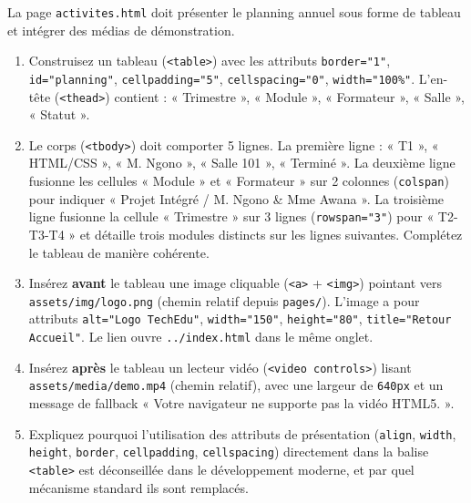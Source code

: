\documentclass[11pt]{article}
\begin{document}
\begin{exercice}
La page \texttt{activites.html} doit présenter le planning annuel sous forme de tableau et intégrer des médias de démonstration.
\begin{enumerate}
    \item Construisez un tableau (\texttt{<table>}) avec les attributs \texttt{border="1"}, \texttt{id="planning"}, \texttt{cellpadding="5"}, \texttt{cellspacing="0"}, \texttt{width="100\%"}. L'en-tête (\texttt{<thead>}) contient : « Trimestre », « Module », « Formateur », « Salle », « Statut ».
    \item Le corps (\texttt{<tbody>}) doit comporter 5 lignes. La première ligne : « T1 », « HTML/CSS », « M. Ngono », « Salle 101 », « Terminé ». La deuxième ligne fusionne les cellules « Module » et « Formateur » sur 2 colonnes (\texttt{colspan}) pour indiquer « Projet Intégré / M. Ngono \& Mme Awana ». La troisième ligne fusionne la cellule « Trimestre » sur 3 lignes (\texttt{rowspan="3"}) pour « T2-T3-T4 » et détaille trois modules distincts sur les lignes suivantes. Complétez le tableau de manière cohérente.
    \item Insérez \textbf{avant} le tableau une image cliquable (\texttt{<a>} + \texttt{<img>}) pointant vers \texttt{assets/img/logo.png} (chemin relatif depuis \texttt{pages/}). L'image a pour attributs \texttt{alt="Logo TechEdu"}, \texttt{width="150"}, \texttt{height="80"}, \texttt{title="Retour Accueil"}. Le lien ouvre \texttt{../index.html} dans le même onglet.
    \item Insérez \textbf{après} le tableau un lecteur vidéo (\texttt{<video controls>}) lisant \texttt{assets/media/demo.mp4} (chemin relatif), avec une largeur de \texttt{640px} et un message de fallback « Votre navigateur ne supporte pas la vidéo HTML5. ».
    \item Expliquez pourquoi l'utilisation des attributs de présentation (\texttt{align}, \texttt{width}, \texttt{height}, \texttt{border}, \texttt{cellpadding}, \texttt{cellspacing}) directement dans la balise \texttt{<table>} est déconseillée dans le développement moderne, et par quel mécanisme standard ils sont remplacés.
\end{enumerate}
\end{exercice}
\end{document}
